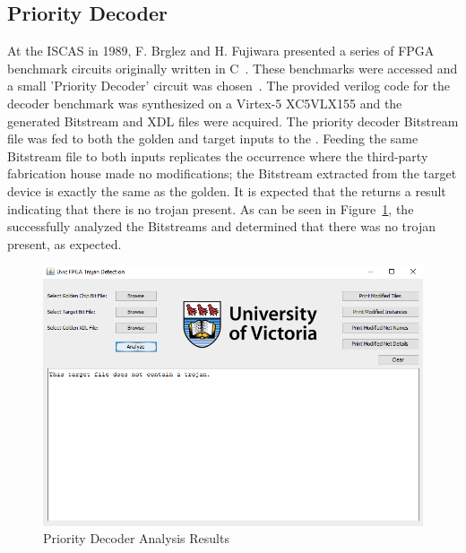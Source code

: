 \subsection{Priority Decoder} \label{sec:priorityDecoder}
At the \acrfull{ISCAS} in 1989, F. Brglez and H. Fujiwara presented a series of \acrshort{FPGA} benchmark circuits originally written in C~\cite{iscas85}. 
These benchmarks were accessed and a small 'Priority Decoder' circuit was chosen~\cite{iscasBenchmarks}.
The provided verilog code for the decoder benchmark was synthesized on a Virtex-5 XC5VLX155 and the generated \gls{Bitstream} and \acrshort{XDL} files were acquired.
The priority decoder \gls{Bitstream} file was fed to both the \gls{golden} and \gls{target} inputs to the \Name.
Feeding the same \gls{Bitstream} file to both inputs replicates the occurrence where the third-party fabrication house made no modifications; the \gls{Bitstream} extracted from the \gls{target} device is exactly the same as the \gls{golden}.
It is expected that the \NameNoPeriod returns a result indicating that there is no trojan present.
As can be seen in Figure~\ref{fig:priorityDecoder}, the \NameNoPeriod successfully analyzed the \gls{Bitstream}s and determined that there was no trojan present, as expected.
\begin{figure}
\centering
\includegraphics[width=1\linewidth]{Figures/priorityDecoder}
\caption[Priority Decoder Analysis Results]{Priority Decoder Analysis Results}
\label{fig:priorityDecoder}
\end{figure}

